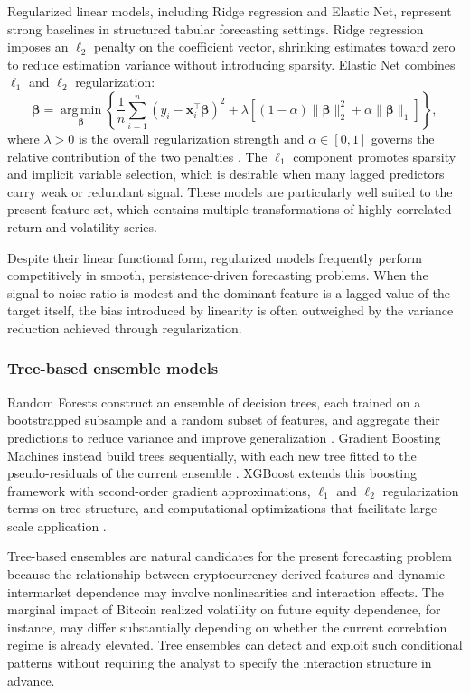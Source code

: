 Regularized linear models, including Ridge regression and Elastic Net, represent strong baselines in structured tabular forecasting settings. Ridge regression imposes an $\ell_2$ penalty on the coefficient vector, shrinking estimates toward zero to reduce estimation variance without introducing sparsity. Elastic Net combines $\ell_1$ and $\ell_2$ regularization:
\begin{equation}
    \hat{\boldsymbol{\beta}} = \operatorname*{arg\,min}_{\boldsymbol{\beta}} \left\{
        \frac{1}{n}\sum_{i=1}^{n}(y_i - \mathbf{x}_i^{\top}\boldsymbol{\beta})^2
        + \lambda \left[(1-\alpha)\|\boldsymbol{\beta}\|_2^2 + \alpha\|\boldsymbol{\beta}\|_1\right]
    \right\},
\end{equation}
where $\lambda > 0$ is the overall regularization strength and $\alpha \in [0,1]$ governs the relative contribution of the two penalties \cite{zou2005}. The $\ell_1$ component promotes sparsity and implicit variable selection, which is desirable when many lagged predictors carry weak or redundant signal. These models are particularly well suited to the present feature set, which contains multiple transformations of highly correlated return and volatility series.

Despite their linear functional form, regularized models frequently perform competitively in smooth, persistence-driven forecasting problems. When the signal-to-noise ratio is modest and the dominant feature is a lagged value of the target itself, the bias introduced by linearity is often outweighed by the variance reduction achieved through regularization.

\subsubsection{Tree-based ensemble models}

Random Forests construct an ensemble of decision trees, each trained on a bootstrapped subsample and a random subset of features, and aggregate their predictions to reduce variance and improve generalization \cite{breiman2001}. Gradient Boosting Machines instead build trees sequentially, with each new tree fitted to the pseudo-residuals of the current ensemble \cite{friedman2001}. XGBoost extends this boosting framework with second-order gradient approximations, $\ell_1$ and $\ell_2$ regularization terms on tree structure, and computational optimizations that facilitate large-scale application \cite{chen2016}.

Tree-based ensembles are natural candidates for the present forecasting problem because the relationship between cryptocurrency-derived features and dynamic intermarket dependence may involve nonlinearities and interaction effects. The marginal impact of Bitcoin realized volatility on future equity dependence, for instance, may differ substantially depending on whether the current correlation regime is already elevated. Tree ensembles can detect and exploit such conditional patterns without requiring the analyst to specify the interaction structure in advance.

